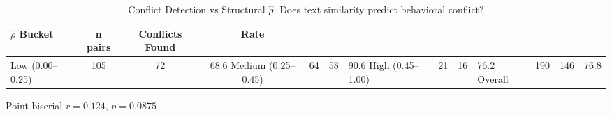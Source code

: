 \begin{table}[h]
\centering
\caption{Conflict Detection vs Structural $\hat{\rho}$: Does text similarity predict behavioral conflict?}
\label{tab:conflict_detection}
\begin{tabular}{lccc}
\toprule
\textbf{$\hat{\rho}$ Bucket} & \textbf{n pairs} & \textbf{Conflicts Found} & \textbf{Rate} \\
\midrule
Low (0.00--0.25) & 105 & 72 & 68.6%
Medium (0.25--0.45) & 64 & 58 & 90.6%
High (0.45--1.00) & 21 & 16 & 76.2%
\midrule
Overall & 190 & 146 & 76.8%
\bottomrule
\end{tabular}

\vspace{0.5em}
Point-biserial $r = 0.124$, $p = 0.0875$
\end{table}
